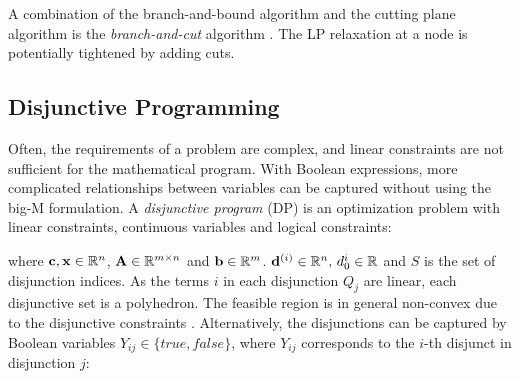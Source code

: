 A combination of the branch-and-bound algorithm and the cutting plane algorithm is the \textit{branch-and-cut} algorithm \cite{integer_programming}. The LP relaxation at a node is potentially tightened by adding cuts. 

\subsection{Disjunctive Programming}
Often, the requirements of a problem are complex, and linear constraints are not sufficient for the mathematical program. With Boolean expressions, more complicated relationships between variables can be captured without using the big-M formulation.     
A \textit{disjunctive program} (DP) is an optimization problem with linear constraints, continuous variables and logical constraints:


\quad where $\bold c, \bold x \in \mathbb{R}^n$, $ \bold A \in \mathbb{R}^{m \times n}$ and $\bold b \in \mathbb{R}^m$. $\bold d^{(i)} \in \mathbb{R}^n, \, d_{0}^i \in \mathbb{R}$ and $S$ is the set of disjunction indices.
As the terms $i$ in each disjunction $Q_j$ are linear, each disjunctive set is a polyhedron. The feasible region is in general non-convex due to the disjunctive constraints \cite{balas_disjunctive_2018}.
Alternatively, the disjunctions can be captured by Boolean variables $Y_{ij} \in \{true, false \}$, where $Y_{ij}$ corresponds to the $i$-th disjunct in disjunction $j$:

